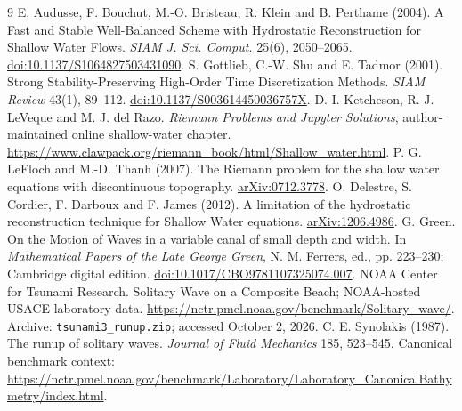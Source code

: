 \documentclass[11pt]{article}
\begin{document}
\begin{thebibliography}{9}
 E. Audusse, F. Bouchut, M.-O. Bristeau, R. Klein and B. Perthame
(2004). A Fast and Stable Well-Balanced Scheme with Hydrostatic Reconstruction
for Shallow Water Flows. \emph{SIAM J. Sci. Comput.} 25(6), 2050--2065.
\href{https://doi.org/10.1137/S1064827503431090}{doi:10.1137/S1064827503431090}.
 S. Gottlieb, C.-W. Shu and E. Tadmor (2001). Strong
Stability-Preserving High-Order Time Discretization Methods.
\emph{SIAM Review} 43(1), 89--112.
\href{https://doi.org/10.1137/S003614450036757X}{doi:10.1137/S003614450036757X}.
 D. I. Ketcheson, R. J. LeVeque and M. J. del Razo.
\emph{Riemann Problems and Jupyter Solutions}, author-maintained online
shallow-water chapter. \url{https://www.clawpack.org/riemann_book/html/Shallow_water.html}.
 P. G. LeFloch and M.-D. Thanh (2007).
The Riemann problem for the shallow water equations with discontinuous topography.
\href{https://arxiv.org/abs/0712.3778}{arXiv:0712.3778}.
 O. Delestre, S. Cordier, F. Darboux and F. James (2012).
A limitation of the hydrostatic reconstruction technique for Shallow Water equations.
\href{https://arxiv.org/abs/1206.4986}{arXiv:1206.4986}.
 G. Green. On the Motion of Waves in a variable canal of small
depth and width. In \emph{Mathematical Papers of the Late George Green},
N. M. Ferrers, ed., pp. 223--230; Cambridge digital edition.
\href{https://doi.org/10.1017/CBO9781107325074.007}{doi:10.1017/CBO9781107325074.007}.
 NOAA Center for Tsunami Research.
Solitary Wave on a Composite Beach; NOAA-hosted USACE laboratory data.
\url{https://nctr.pmel.noaa.gov/benchmark/Solitary_wave/}.
Archive: \texttt{tsunami3\_runup.zip}; accessed October 2, 2026.
 C. E. Synolakis (1987). The runup of solitary waves.
\emph{Journal of Fluid Mechanics} 185, 523--545.
Canonical benchmark context: \url{https://nctr.pmel.noaa.gov/benchmark/Laboratory/Laboratory_CanonicalBathymetry/index.html}.
\end{thebibliography}
\end{document}
